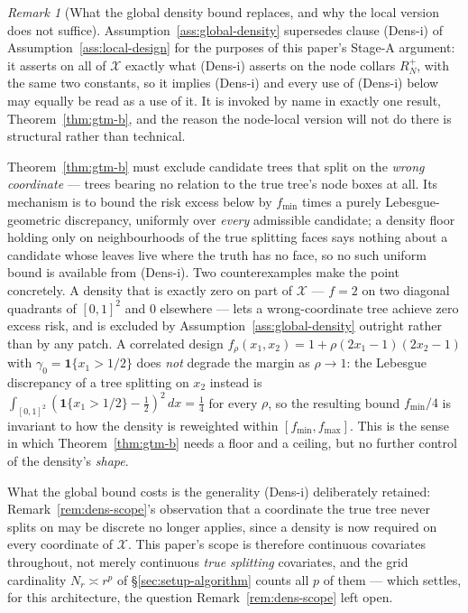 \documentclass[11pt]{article}
\theoremstyle{plain}
\theoremstyle{definition}
\theoremstyle{remark}
\newtheorem{remark}[theorem]{Remark}
\newcommand{\cX}{\mathcal{X}}
\begin{document}
\begin{remark}[What the global density bound replaces, and why the local
version does not suffice]\label{rem:global-density-role}
Assumption~\ref{ass:global-density} supersedes clause (Dens-i) of
Assumption~\ref{ass:local-design} for the purposes of this paper's Stage-A
argument: it asserts on all of \(\cX\) exactly what (Dens-i) asserts on the
node collars \(R_N^+\), with the same two constants, so it implies (Dens-i)
and every use of (Dens-i) below may equally be read as a use of it. It is
invoked by name in exactly one result, Theorem~\ref{thm:gtm-b}, and the
reason the node-local version will not do there is structural rather than
technical.

Theorem~\ref{thm:gtm-b} must exclude candidate trees that split on the
\emph{wrong coordinate} --- trees bearing no relation to the true tree's node
boxes at all. Its mechanism is to bound the risk excess below by
\(f_{\min}\) times a purely Lebesgue-geometric discrepancy, uniformly over
\emph{every} admissible candidate; a density floor holding only on
neighbourhoods of the true splitting faces says nothing about a candidate
whose leaves live where the truth has no face, so no such uniform bound is
available from (Dens-i). Two counterexamples make the point concretely.
A density that is exactly zero on part of \(\cX\) --- \(f=2\) on two diagonal
quadrants of \([0,1]^2\) and \(0\) elsewhere --- lets a wrong-coordinate tree
achieve zero excess risk, and is excluded by
Assumption~\ref{ass:global-density} outright rather than by any patch. A
correlated design \(f_\rho(x_1,x_2)=1+\rho(2x_1-1)(2x_2-1)\) with
\(\gamma_0=\mathbf 1\{x_1>1/2\}\) does \emph{not} degrade the margin as
\(\rho\to1\): the Lebesgue discrepancy of a tree splitting on \(x_2\) instead
is \(\int_{[0,1]^2}(\mathbf 1\{x_1>1/2\}-\tfrac12)^2\,dx=\tfrac14\) for every
\(\rho\), so the resulting bound \(f_{\min}/4\) is invariant to how the
density is reweighted within \([f_{\min},f_{\max}]\). This is the sense in
which Theorem~\ref{thm:gtm-b} needs a floor and a ceiling, but no further
control of the density's \emph{shape}.

What the global bound costs is the generality (Dens-i) deliberately retained:
Remark~\ref{rem:dens-scope}'s observation that a coordinate the true tree
never splits on may be discrete no longer applies, since a density is now
required on every coordinate of \(\cX\). This paper's scope is therefore
continuous covariates throughout, not merely continuous \emph{true splitting}
covariates, and the grid cardinality \(N_r\asymp r^p\) of
\S\ref{sec:setup-algorithm} counts all \(p\) of them --- which settles, for
this architecture, the question Remark~\ref{rem:dens-scope} left open.
\end{remark}
\end{document}
